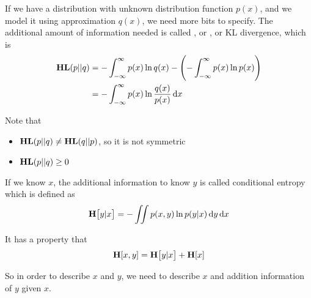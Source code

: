 \begin{definition}
    If we have a distribution with unknown distribution function $p(x)$, and we model it using approximation $q(x)$, we need more bits to specify. The additional amount of information needed is called , or , or KL divergence, which is
    \begin{equation}
        \begin{aligned}
            \kldivergence{p}{q} &= - \int_{-\infty}^{\infty} p(x) \ln q(x) - \mleft(- \int_{-\infty}^{\infty}  p(x) \ln p(x) \mright) \\
            &= - \int_{-\infty}^{\infty} p(x) \ln \frac{q(x)}{p(x)} \dif x
        \end{aligned}        
    \end{equation}
    
    Note that 
    \begin{itemize}
        \item $\kldivergence{p}{q} \neq \kldivergence{q}{p}$, so it is not symmetric
        \item $\kldivergence{p}{q} \geq 0$
    \end{itemize}
\end{definition}


\begin{definition}
    If we know $x$, the additional information to know $y$ is called conditional entropy which is defined as
    \begin{equation}
        \entropy{y | x} = - \iint p(x,y) \ln p(y | x) \dif y \dif x
    \end{equation}
    
    It has a property that
    \begin{equation}
        \entropy{x, y} = \entropy{y|x} + \entropy{x}
    \end{equation}
    
    So in order to describe $x$ and $y$, we need to describe $x$ and addition information of $y$ given $x$.
\end{definition}

